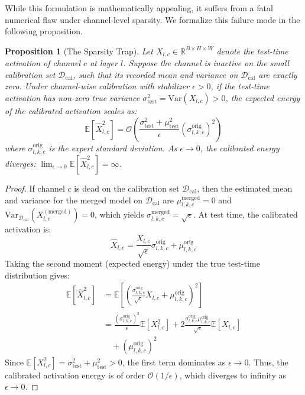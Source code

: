 \documentclass{article}
\theoremstyle{plain}
\newtheorem{proposition}[theorem]{Proposition}
\theoremstyle{definition}
\theoremstyle{remark}
\begin{document}
While this formulation is mathematically appealing, it suffers from a fatal numerical flaw under channel-level sparsity. We formalize this failure mode in the following proposition.

\begin{proposition}[The Sparsity Trap]
\label{prop:sparsity_trap}
Let $X_{l, c} \in \mathbb{R}^{B \times H \times W}$ denote the test-time activation of channel $c$ at layer $l$. Suppose the channel is inactive on the small calibration set $\mathcal{D}_{\text{cal}}$, such that its recorded mean and variance on $\mathcal{D}_{\text{cal}}$ are exactly zero. Under channel-wise calibration with stabilizer $\epsilon > 0$, if the test-time activation has non-zero true variance $\sigma_{\text{test}}^2 = \text{Var}(X_{l, c}) > 0$, the expected energy of the calibrated activation scales as:
\begin{equation}
    \mathbb{E}[\hat{X}_{l, c}^2] = \mathcal{O}\left( \frac{\sigma_{\text{test}}^2 + \mu_{\text{test}}^2}{\epsilon} (\sigma_{l, k, c}^{\text{orig}})^2 \right)
\end{equation}
where $\sigma_{l, k, c}^{\text{orig}}$ is the expert standard deviation. As $\epsilon \to 0$, the calibrated energy diverges: $\lim_{\epsilon \to 0} \mathbb{E}[\hat{X}_{l, c}^2] = \infty$.
\end{proposition}

\begin{proof}
If channel $c$ is dead on the calibration set $\mathcal{D}_{\text{cal}}$, then the estimated mean and variance for the merged model on $\mathcal{D}_{\text{cal}}$ are $\mu_{l,k, c}^{\text{merged}} = 0$ and $\text{Var}_{\mathcal{D}_{\text{cal}}}(X_{l, c}^{(\text{merged})}) = 0$, which yields $\sigma_{l,k, c}^{\text{merged}} = \sqrt{\epsilon}$. 
At test time, the calibrated activation is:
\begin{equation}
    \hat{X}_{l, c} = \frac{X_{l, c}}{\sqrt{\epsilon}} \sigma_{l,k, c}^{\text{orig}} + \mu_{l,k, c}^{\text{orig}}
\end{equation}
Taking the second moment (expected energy) under the true test-time distribution gives:
\begin{align}
    \mathbb{E}[\hat{X}_{l, c}^2] &= \mathbb{E}\left[ \left( \frac{\sigma_{l,k, c}^{\text{orig}}}{\sqrt{\epsilon}} X_{l, c} + \mu_{l,k, c}^{\text{orig}} \right)^2 \right] \\
    &= \frac{(\sigma_{l,k, c}^{\text{orig}})^2}{\epsilon} \mathbb{E}[X_{l, c}^2] + 2 \frac{\sigma_{l,k, c}^{\text{orig}}\mu_{l,k, c}^{\text{orig}}}{\sqrt{\epsilon}} \mathbb{E}[X_{l, c}] \nonumber \\
    &\quad + (\mu_{l,k, c}^{\text{orig}})^2
\end{align}
Since $\mathbb{E}[X_{l, c}^2] = \sigma_{\text{test}}^2 + \mu_{\text{test}}^2 > 0$, the first term dominates as $\epsilon \to 0$. Thus, the calibrated activation energy is of order $\mathcal{O}(1/\epsilon)$, which diverges to infinity as $\epsilon \to 0$.
\end{proof}
\end{document}
